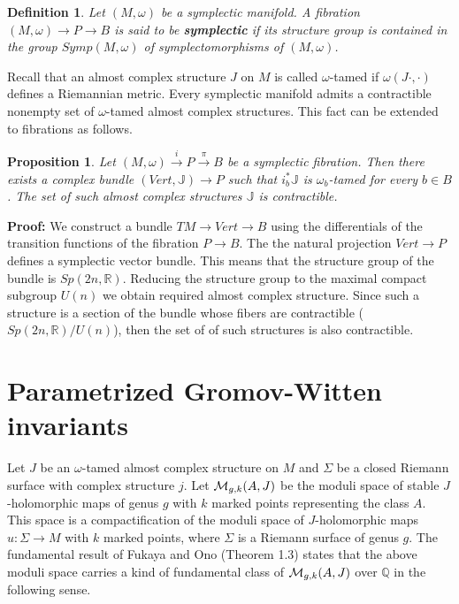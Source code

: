 \documentclass[a4paper,14pt]{article}
\newcommand{\B}[1]{\mathbb #1}
\newcommand{\C}[1]{{\cal #1}}
\newcommand{\om}{{\omega}}
\newcommand{\Si}{{\Sigma}}
\newcommand{\qed}{\rightline {$\Box $}}
\newcommand{\map}[1]{\stackrel {#1}\longrightarrow}
\newcommand{\Mo}{(M,\omega )}
\newcommand{\sfib}{\Mo \map{i} P\map{\pi } B}
\newcommand{\pf}{\NI {\bf Proof: }}
\newcommand{\NI}{{\noindent}}
\newtheorem{defin}[theorem]{Definition}
\newtheorem{prop}[theorem]{Proposition}
\numberwithin{equation}{section}
\begin{document}
\begin{defin}\label{D:sf}
Let $\Mo $ be a symplectic manifold. A fibration
$\Mo \to P \to B$ is said to be {\bf symplectic} if
its structure group is contained in the group $Symp\Mo $
of symplectomorphisms of $\Mo $.
\end{defin}


Recall that an almost complex structure $J$ on $M$ is called
$\om $-tamed if $\om (J\cdot ,\cdot )$ defines
a Riemannian metric. Every symplectic manifold admits
a contractible nonempty set of $\om $-tamed almost complex
structures. This fact can be extended to fibrations
as follows.


\begin{prop}\label{P:acs}
Let $\sfib $ be a symplectic fibration. 
Then there exists a complex bundle $(Vert,\B J) \to P$ such
that $i_b^*\B J$ is $\om _b$-tamed for every $b\in B$.
The set of such almost complex structures $\B J$ is
contractible.
\end{prop}


\pf
We construct a bundle $TM\to Vert\to B$ using the differentials
of the transition functions of the fibration $P\to B$. The
the natural projection $Vert\to P$ defines a 
symplectic vector bundle. This means that 
the structure group of the bundle is $Sp(2n,\B R)$.
Reducing the structure group to the maximal compact
subgroup $U(n)$ we obtain required almost complex
structure. Since such a structure is a section of
the bundle whose fibers are contractible 
($Sp(2n,\B R)\slash U(n)$), then the set of
of such structures is also contractible.

\qed











\section{Parametrized Gromov-Witten invariants}\label{S:gw}

Let $J$ be an $\om $-tamed almost complex structure on $M$ and
$\Si $ be a closed Riemann surface with complex structure $j$.
Let $\C M_{g,k}(A,J)$ be the moduli space of 
stable $J$-holomorphic maps of genus $g$ with $k$ marked
points representing the class $A$. This space is
a compactification of the moduli space of $J$-holomorphic maps 
$u:\Si \to M$ with $k$ marked points, where $\Si $ is a
Riemann surface of genus $g$. The fundamental result of
Fukaya and Ono \cite{fo}(Theorem 1.3)  states that the above
moduli space carries a kind of fundamental class of
$\C M_{g,k}(A,J)$ over $\B Q$ in the following sense.
\end{document}
